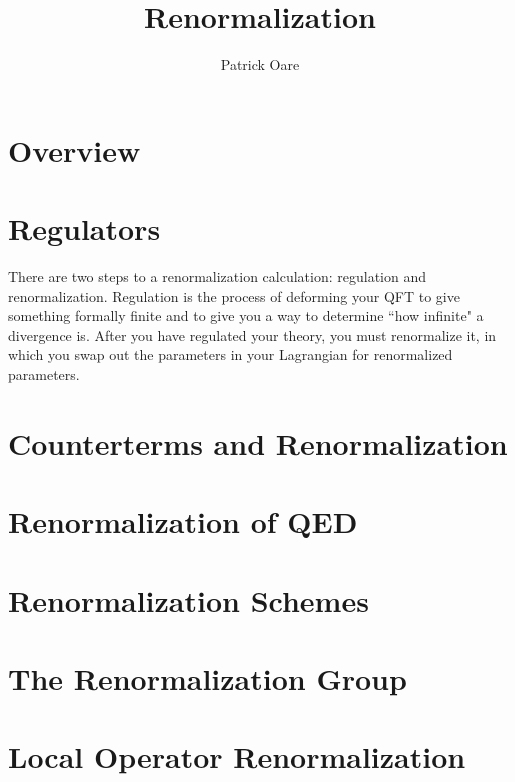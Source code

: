 \documentclass[11pt, oneside]{article}   	%
\title{Renormalization}
\author{Patrick Oare}
\date{}							%
\theoremstyle{definition}
\begin{document}
\maketitle
\section{Overview}

\section{Regulators}

There are two steps to a renormalization calculation: regulation and renormalization. Regulation is the process of deforming 
your QFT to give something formally finite and to give you a way to determine ``how infinite" a divergence is. After you 
have regulated your theory, you must renormalize it, in which you swap out the parameters in your Lagrangian for 
renormalized parameters. 

\section{Counterterms and Renormalization}

\section{Renormalization of QED}

\section{Renormalization Schemes}

\section{The Renormalization Group}

\section{Local Operator Renormalization}
\end{document}
